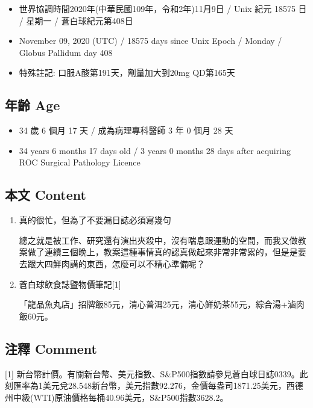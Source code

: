 \documentclass[a5paper, 11pt
]{book}
\providecommand{\tightlist}{%
  \setlength{\itemsep}{0pt}\setlength{\parskip}{0pt}}
\begin{document}
\begin{itemize}
\tightlist
\item
  世界協調時間2020年(中華民國109年，令和2年)11月9日 / Unix 紀元 18575 日
  / 星期一 / 蒼白球紀元第408日
\item
  November 09, 2020 (UTC) / 18575 days since Unix Epoch / Monday /
  Globus Pallidum day 408
\item
  特殊註記: 口服A酸第191天，劑量加大到20mg QD第165天
\end{itemize}

\hypertarget{ux5e74ux9f61-age-64}{%
\subsection{年齡 Age}\label{ux5e74ux9f61-age-64}}

\begin{itemize}
\tightlist
\item
  34 歲 6 個月 17 天 / 成為病理專科醫師 3 年 0 個月 28 天
\item
  34 years 6 months 17 days old / 3 years 0 months 28 days after
  acquiring ROC Surgical Pathology Licence
\end{itemize}

\hypertarget{ux672cux6587-content-64}{%
\subsection{本文 Content}\label{ux672cux6587-content-64}}

\begin{enumerate}
\def\labelenumi{\arabic{enumi}.}
\item
  真的很忙，但為了不要漏日誌必須寫幾句

  總之就是被工作、研究還有演出夾殺中，沒有喘息跟運動的空間，而我又做教案做了連續三個晚上，教案這種事情真的認真做起來非常非常累的，但是是要去跟大四鮮肉講的東西，怎麼可以不精心準備呢？
\item
  蒼白球飲食誌暨物價筆記{[}1{]}

  「龍品魚丸店」招牌飯85元，清心普洱25元，清心鮮奶茶55元，綜合湯+滷肉飯60元。
\end{enumerate}

\hypertarget{ux6ce8ux91cb-comment-64}{%
\subsection{注釋 Comment}\label{ux6ce8ux91cb-comment-64}}

{[}1{]}
新台幣計價。有關新台幣、美元指數、S\&P500指數請參見蒼白球日誌0339。此刻匯率為1美元兌28.548新台幣，美元指數92.276，金價每盎司1871.25美元，西德州中級(WTI)原油價格每桶40.96美元，S\&P500指數3628.2。
\end{document}
